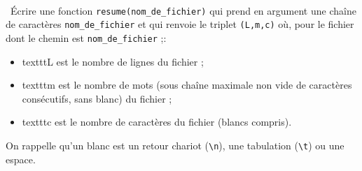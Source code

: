 \exer{[FIC-001]}
\setcounter{numques}{0}~\\

\question\ \'Ecrire une fonction \texttt{resume(nom\_de\_fichier)} qui prend en argument une chaîne de caractères \texttt{nom\_de\_fichier} et qui renvoie le triplet \texttt{(L,m,c)} où, pour le fichier dont le chemin est \texttt{nom\_de\_fichier} ;: 
    \begin{itemize}
      \item texttt{L} est le nombre de lignes du fichier ;
      \item texttt{m} est le nombre de mots (sous chaîne maximale non vide de caractères consécutifs, sans blanc)  du fichier  ;
      \item texttt{c} est le nombre de caractères  du fichier (blancs compris).
    \end{itemize}
On rappelle qu'un blanc est un retour chariot (\texttt{\textbackslash{}n}), une tabulation (\texttt{\textbackslash{}t}) ou une espace.
